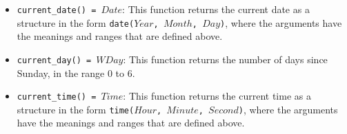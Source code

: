 \begin{itemize}
\item \texttt{current\_date() = $Date$}: This function returns the current date as a structure in the form \texttt{date($Year$, $Month$, $Day$)}, where the arguments have the meanings and ranges that are defined above.

\item \texttt{current\_day() = $WDay$}: This function returns the number of days since Sunday, in the range 0 to 6. 

\item \texttt{current\_time() = $Time$}: This function returns the current time as a structure in the form \texttt{time($Hour$, $Minute$, $Second$)}, where the arguments have the meanings and ranges that are defined above.

\end{itemize}
\ignore{

}
